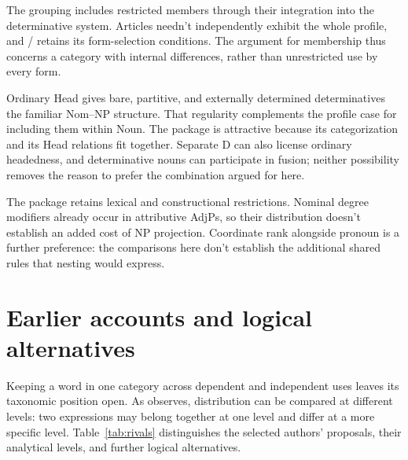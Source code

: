 \documentclass[12pt]{article}
\begin{document}
The grouping includes restricted members through their integration into the determinative system. Articles needn't independently exhibit the whole profile, and / retains its form-selection conditions. The argument for membership thus concerns a category with internal differences, rather than unrestricted use by every form.

Ordinary Head gives bare, partitive, and externally determined determinatives the familiar Nom--NP structure. That regularity complements the profile case for including them within Noun. The package is attractive because its categorization and its Head relations fit together. Separate D can also license ordinary headedness, and determinative nouns can participate in fusion; neither possibility removes the reason to prefer the combination argued for here.

The package retains lexical and constructional restrictions. Nominal degree modifiers already occur in attributive AdjPs, so their distribution doesn't establish an added cost of NP projection. Coordinate rank alongside pronoun is a further preference: the comparisons here don't establish the additional shared rules that nesting would express.

\appendix

\section{Earlier accounts and logical alternatives}\label{sec:historical}

Keeping a word in one category across dependent and independent uses leaves its taxonomic position open. As \textcite[232--235]{lyons1968} observes, distribution can be compared at different levels: two expressions may belong together at one level and differ at a more specific level. Table~\ref{tab:rivals} distinguishes the selected authors' proposals, their analytical levels, and further logical alternatives.
\end{document}

